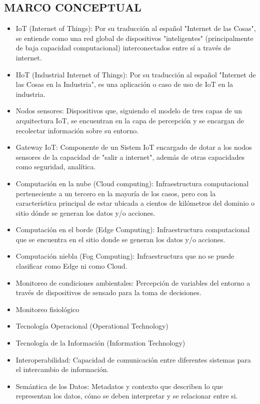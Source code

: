 \documentclass[stu,12pt,floatsintext]{apa7}
\begin{document}
	\subsection{MARCO CONCEPTUAL}
		\begin{itemize}
		\item IoT (Internet of Things): Por su traducción al español "Internet de las Cosas", se entiende como una red global de dispositivos "inteligentes" (principalmente de baja capacidad computacional) interconectados entre sí a través de internet.
		\item IIoT (Industrial Internet of Things): Por su traducción al español "Internet de las Cosas en la Industria", es una aplicación o caso de uso de IoT en la industria.
		\item Nodos sensores: Dispositivos que, siguiendo el modelo de tres capas de un arquitectura IoT, se encuentran en la capa de percepción y se encargan de recolectar información sobre su entorno.
		\item Gateway IoT: Componente de un Sistem IoT encargado de dotar a los nodos sensores de la capacidad de "salir a internet", además de otras capacidades como seguridad, analítica.
		\item Computación en la nube (Cloud computing): Infraestructura computacional perteneciente a un tercero en la mayoría de los casos, pero con la característica principal de estar ubicada a cientos de kilómetros del dominio o sitio dónde se generan los datos y/o acciones.
		\item Computación en el borde (Edge Computing): Infraestructura computacional que se encuentra en el sitio donde se generan los datos y/o acciones.
		\item Computación niebla (Fog Computing): Infraestructura que no se puede clasificar como Edge ni como Cloud.
		\item Monitoreo de condiciones ambientales: Percepción de variables del entorno a través de dispositivos de sensado para la toma de decisiones.
		\item Monitoreo fisiológico %
		\item Tecnología Operacional (Operational Technology)
		\item Tecnología de la Información (Information Technology)
		\item Interoperabilidad: Capacidad de comunicación entre diferentes sistemas para el intercambio de información.
		\item Semántica de los Datos: Metadatos y contexto que describen lo que representan los datos, cómo se deben interpretar y se relacionar entre si.

\end{itemize}
\end{document}
